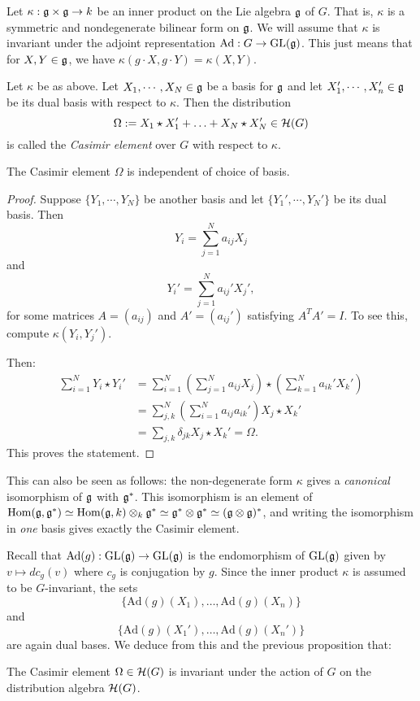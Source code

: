 \documentclass[11pt, english]{article}
\begin{document}
Let $\kappa: \mathfrak g \times \mathfrak g \to k$ be an inner product on the Lie algebra $\mathfrak g$ of $G$. That is, $\kappa$ is a symmetric and nondegenerate bilinear form on $\mathfrak g$. We will assume that $\kappa$ is invariant under the adjoint representation $\mathrm{Ad}: G \to \operatorname{GL}(\mathfrak g)$. This just means that for $X,Y \in \mathfrak g$, we have $\kappa(g \cdot X,g \cdot Y)=\kappa(X,Y)$. 

\begin{defi}

Let $\kappa$ be as above. Let $X_1,\cdots,X_N \in \mathfrak g$ be a basis for $\mathfrak g$ and let $X_1',\cdots,X_n' \in \mathfrak g$ be its dual basis with respect to $\kappa$. Then the distribution
$$
\Omega := X_1 \star X_1' + \ldots + X_N \star X_N' \in \mathcal{H}(G)
$$
is called the \emph{Casimir element} over $G$ with respect to $\kappa$.
\end{defi}

\begin{prop}
 The Casimir element $\Omega$ is independent of choice of basis.
\end{prop}
\begin{proof}
Suppose $\{ Y_1, \cdots, Y_N \}$ be another basis and let $ \{ Y_1',\cdots, Y_N'\}$ be its dual basis. Then
$$
Y_i = \sum_{j=1}^N a_{ij} X_j
$$
and
$$
Y_i' = \sum_{j=1}^N a_{ij}' X_j',
$$
for some matrices $A=(a_{ij})$ and $A'=(a_{ij}')$ satisfying $A^TA'=I$. To see this, compute $\kappa(Y_i,Y_j')$. 

Then:
\begin{align*}
\sum_{i=1}^N Y_i \star Y_i' &= \sum_{i=1}^N\left(\sum_{j=1}^N a_{ij} X_j \right) \star \left( \sum_{k=1}^N a_{ik}' X_k' \right) \\
&= \sum_{j,k}^N \left( \sum_{i=1}^N a_{ij} a_{ik}' \right) X_j \star X_k' \\
&= \sum_{j,k} \delta_{jk} X_j \star X_k' = \Omega.
\end{align*}
This proves the statement.
\end{proof}
\begin{remark}
This can also be seen as follows: the non-degenerate form $\kappa$ gives a \emph{canonical} isomorphism of $\mathfrak g$ with $\mathfrak g^\ast$. This isomorphism is an element of $\operatorname{Hom}(\mathfrak g,\mathfrak g^\ast)\simeq \operatorname{Hom}(\mathfrak g,k) \otimes_k \mathfrak g^\ast \simeq \mathfrak g^\ast \otimes \mathfrak g^\ast \simeq (\mathfrak g \otimes \mathfrak g)^\ast$, and writing the isomorphism in \emph{one} basis gives exactly the Casimir element.
\end{remark}

Recall that $\mathrm{Ad}(g):\operatorname{GL}(\mathfrak g) \to \operatorname{GL}(\mathfrak g)$ is the endomorphism of $\operatorname{GL}(\mathfrak g)$ given by $v \mapsto dc_g(v)$ where $c_g$ is conjugation by $g$. Since the inner product $\kappa$ is assumed to be $G$-invariant, the sets
$$
\{ \mathrm{Ad}(g)(X_1),\ldots, \mathrm{Ad}(g)(X_n) \}
$$ 
and 
$$
\{ \mathrm{Ad}(g)(X_1'),\ldots, \mathrm{Ad}(g)(X_n') \}
$$ 
are again dual bases. We deduce from this and the previous proposition that:
\begin{corr}
The Casimir element $\Omega \in \mathcal{H}(G)$ is invariant under the action of $G$ on the distribution algebra $\mathcal{H}(G)$.
\end{corr}
\end{document}
